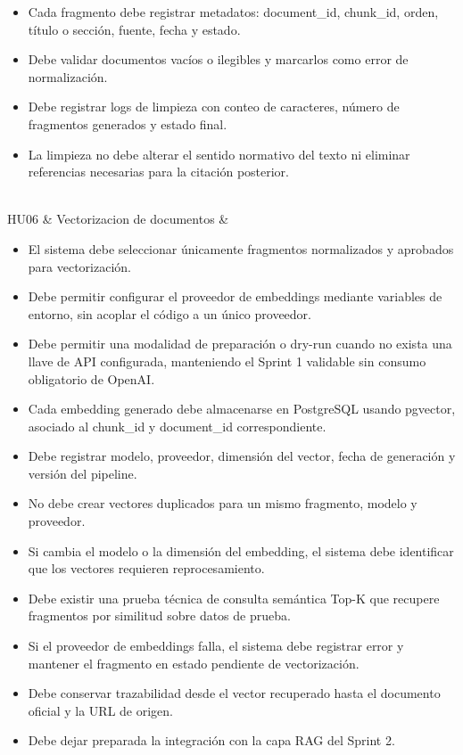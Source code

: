 \documentclass[12pt,a4paper,oneside]{report}
\begin{document}
\begin{longtable}[]
\begin{minipage}[t]{\linewidth}
\begin{itemize}
  recuperación semántica.
\item
  Cada fragmento debe registrar metadatos: document\_id, chunk\_id,
  orden, título o sección, fuente, fecha y estado.
\item
  Debe validar documentos vacíos o ilegibles y marcarlos como error de
  normalización.
\item
  Debe registrar logs de limpieza con conteo de caracteres, número de
  fragmentos generados y estado final.
\item
  La limpieza no debe alterar el sentido normativo del texto ni eliminar
  referencias necesarias para la citación posterior.
\end{itemize}
\end{minipage} \\
HU06 & Vectorizacion de documentos &
\begin{minipage}[t]{\linewidth}\raggedright
\begin{itemize}
\item
  El sistema debe seleccionar únicamente fragmentos normalizados y
  aprobados para vectorización.
\item
  Debe permitir configurar el proveedor de embeddings mediante variables
  de entorno, sin acoplar el código a un único proveedor.
\item
  Debe permitir una modalidad de preparación o dry-run cuando no exista
  una llave de API configurada, manteniendo el Sprint 1 validable sin
  consumo obligatorio de OpenAI.
\item
  Cada embedding generado debe almacenarse en PostgreSQL usando
  pgvector, asociado al chunk\_id y document\_id correspondiente.
\item
  Debe registrar modelo, proveedor, dimensión del vector, fecha de
  generación y versión del pipeline.
\item
  No debe crear vectores duplicados para un mismo fragmento, modelo y
  proveedor.
\item
  Si cambia el modelo o la dimensión del embedding, el sistema debe
  identificar que los vectores requieren reprocesamiento.
\item
  Debe existir una prueba técnica de consulta semántica Top-K que
  recupere fragmentos por similitud sobre datos de prueba.
\item
  Si el proveedor de embeddings falla, el sistema debe registrar error y
  mantener el fragmento en estado pendiente de vectorización.
\item
  Debe conservar trazabilidad desde el vector recuperado hasta el
  documento oficial y la URL de origen.
\item
  Debe dejar preparada la integración con la capa RAG del Sprint 2.
\end{itemize}
\end{minipage} \\
\end{longtable}
\end{document}
